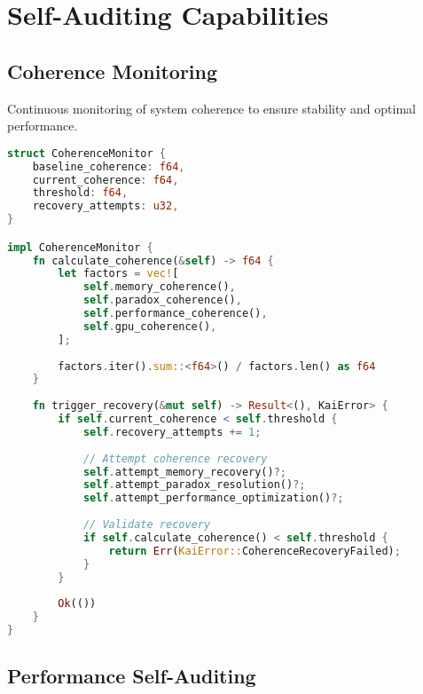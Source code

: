 \documentclass[11pt]{report}
\newcommand{\codebox}[2]{
  \begin{tcolorbox}[
    colback=gray!5,
    colframe=kai_blue,
    title=#1,
    fonttitle=\bfseries
  ]
  #2
  \end{tcolorbox}
}
\newcommand{\observerbox}[2]{
  \begin{tcolorbox}[
    colback=green!5,
    colframe=kai_green,
    title=#1,
    fonttitle=\bfseries
  ]
  #2
  \end{tcolorbox}
}
\begin{document}
\chapter{Self-Auditing Capabilities}

\section{Coherence Monitoring}

\observerbox{Coherence Monitoring - System Stability}{
Continuous monitoring of system coherence to ensure stability and optimal performance.
}

\codebox{Coherence Calculation}{
\begin{lstlisting}[language=rust]
struct CoherenceMonitor {
    baseline_coherence: f64,
    current_coherence: f64,
    threshold: f64,
    recovery_attempts: u32,
}

impl CoherenceMonitor {
    fn calculate_coherence(&self) -> f64 {
        let factors = vec![
            self.memory_coherence(),
            self.paradox_coherence(),
            self.performance_coherence(),
            self.gpu_coherence(),
        ];
        
        factors.iter().sum::<f64>() / factors.len() as f64
    }
    
    fn trigger_recovery(&mut self) -> Result<(), KaiError> {
        if self.current_coherence < self.threshold {
            self.recovery_attempts += 1;
            
            // Attempt coherence recovery
            self.attempt_memory_recovery()?;
            self.attempt_paradox_resolution()?;
            self.attempt_performance_optimization()?;
            
            // Validate recovery
            if self.calculate_coherence() < self.threshold {
                return Err(KaiError::CoherenceRecoveryFailed);
            }
        }
        
        Ok(())
    }
}
\end{lstlisting}
}

\section{Performance Self-Auditing}
\end{document}
